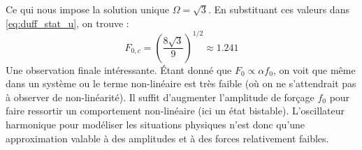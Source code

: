 %
Ce qui nous impose la solution unique $\Omega = \sqrt{3}$. En substituant ces valeurs dans \eqref{eq:duff_stat_u}, on trouve :
%
\begin{equation}
    F_{0,c} = \left(  \frac{8\sqrt{3}}{9}  \right)^{1/2} \approx 1.241
\end{equation}
%
%
Une observation finale intéressante. Étant donné que $F_0 \propto \alpha f_0$, 
on voit que même dans un système ou le terme non-linéaire est très faible (où on ne s'attendrait pas à observer de non-linéarité). Il suffit d'augmenter l'amplitude de forçage $f_0$ 
pour faire ressortir un comportement non-linéaire (ici un état bistable). L'oscillateur harmonique pour modéliser les situations physiques n'est donc qu'une approximation valable à des amplitudes et à des forces relativement faibles.